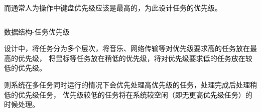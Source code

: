 而通常人为操作中键盘优先级应该是最高的，为此设计任务的优先级。

\begin{listing}[H]
  \inputminted[tabsize=2, firstline=222, lastline=226,
    linenos=true]{c}{../ZOS/src/kernel/bootpack.h}
  \caption{数据结构-任务优先级}
  \label{lst:task_level}
\end{listing}

设计中，将任务分为多个层次，将音乐、网络传输等对优先级要求高的任务放在最高的优先级，
将鼠标等任务放在稍低的优先级，将对优先级要求低的任务放在较低的优先级。

则系统在多任务同时运行的情况下会优先处理高优先级的任务，处理完成后处理稍低的优先级任务，
优先级较低的任务将在系统较空闲（即无更高优先级任务）的时候处理。

% 
% 
% 
